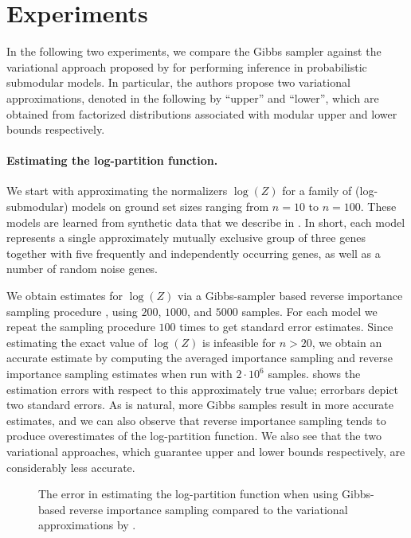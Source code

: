 \section{Experiments}
In the following two experiments, we compare the Gibbs sampler against the variational approach proposed by \cite{djolonga14} for performing inference in probabilistic submodular models.
In particular, the authors propose two variational approximations, denoted in the following by ``upper'' and ``lower'', which are obtained from factorized distributions associated with modular upper and lower bounds respectively.

\paragraph{Estimating the log-partition function.}
We start with approximating the normalizers $\log(Z)$ for a family of (log-submodular) \flid{} models on ground set sizes ranging from $n = 10$ to $n = 100$.
These \flid{} models are learned from synthetic data that we describe in .
In short, each model represents a single approximately mutually exclusive group of three genes together with five frequently and independently occurring genes, as well as a number of random noise genes.

We obtain estimates for $\log(Z)$ via a Gibbs-sampler based reverse importance sampling procedure , using $200$, $1000$, and $5000$ samples.
For each model we repeat the sampling procedure $100$ times to get standard error estimates.
Since estimating the exact value of $\log(Z)$ is infeasible for $n > 20$, we obtain an accurate estimate by computing the averaged importance sampling and reverse importance sampling estimates when run with $2\cdot 10^6$ samples.
 shows the estimation errors with respect to this approximately true value; errorbars depict two standard errors.
As is natural, more Gibbs samples result in more accurate estimates, and we can also observe that reverse importance sampling tends to produce overestimates of the log-partition function.
We also see that the two variational approaches, which guarantee upper and lower bounds respectively, are considerably less accurate.

\setlength{}
\setlength{}
\renewcommand{\subflen}{\textwidth}
\begin{figure}[tb]
  \centering
  
  \caption{The error in estimating the log-partition function when using Gibbs-based reverse importance sampling compared to the variational approximations by \cite{djolonga14}.}
  \label{fig:gibbs_zest}
\end{figure}

